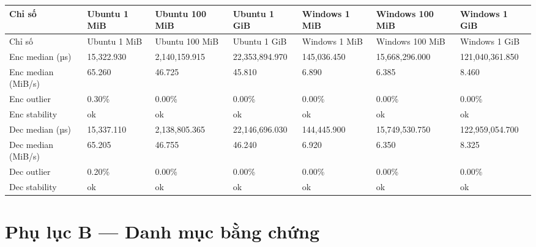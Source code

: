 \documentclass[12pt,a4paper,oneside]{report}
\newcommand{\tablesize}{\footnotesize}
\begin{document}
{\renewcommand{\tablesize}{\scriptsize}\begin{longtable}{p{}p{}p{}p{}p{}p{}p{}}
\toprule
Chỉ số & Ubuntu 1 MiB & Ubuntu 100 MiB & Ubuntu 1 GiB & Windows 1 MiB & Windows 100 MiB & Windows 1 GiB \\
\midrule
\endfirsthead
\toprule
Chỉ số & Ubuntu 1 MiB & Ubuntu 100 MiB & Ubuntu 1 GiB & Windows 1 MiB & Windows 100 MiB & Windows 1 GiB \\
\midrule
\endhead
Enc median (µs) & 15,322.930 & 2,140,159.915 & 22,353,894.970 & 145,036.450 & 15,668,296.000 & 121,040,361.850 \\
Enc median (MiB/s) & 65.260 & 46.725 & 45.810 & 6.890 & 6.385 & 8.460 \\
Enc outlier & 0.30\% & 0.00\% & 0.00\% & 0.00\% & 0.00\% & 0.00\% \\
Enc stability & ok & ok & ok & ok & ok & ok \\
Dec median (µs) & 15,337.110 & 2,138,805.365 & 22,146,696.030 & 144,445.900 & 15,749,530.750 & 122,959,054.700 \\
Dec median (MiB/s) & 65.205 & 46.755 & 46.240 & 6.920 & 6.350 & 8.325 \\
Dec outlier & 0.20\% & 0.00\% & 0.00\% & 0.00\% & 0.00\% & 0.00\% \\
Dec stability & ok & ok & ok & ok & ok & ok \\
\bottomrule
\end{longtable}}


\section{Phụ lục B — Danh mục bằng chứng}
\end{document}

